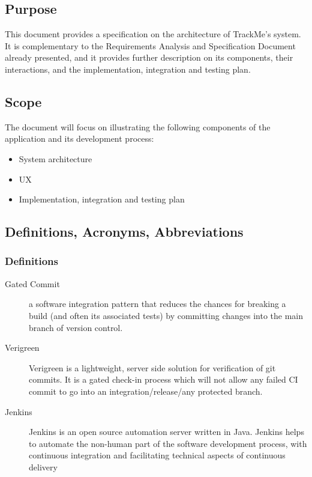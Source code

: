 \documentclass[../main.tex]{subfiles}
\begin{document}
\subsection{Purpose}

This document provides a specification on the architecture of TrackMe's system. It is complementary to the Requirements Analysis and Specification Document already presented, and it provides further description on its components, their interactions, and the implementation, integration and testing plan.

\subsection{Scope}

The document will focus on illustrating the following components of the application and its development process:

\begin{itemize}

	\item{System architecture}
	\item{UX}
	\item{Implementation, integration and testing plan}

\end{itemize}

\subsection{Definitions, Acronyms, Abbreviations}


	\subsubsection{Definitions}
		\begin{description}
			\item[Gated Commit] a software integration pattern that reduces the chances for breaking a build (and often its associated tests) by committing changes into the main branch of version control.
			\item[Verigreen] Verigreen is a lightweight, server side solution for verification of git commits. It is a gated check-in process which will not allow any failed CI commit to go into an integration/release/any protected branch.
			\item[Jenkins]  Jenkins is an open source automation server written in Java. Jenkins helps to automate the non-human part of the software development process, with continuous integration and facilitating technical aspects of continuous delivery
		\end{description}
\end{document}
